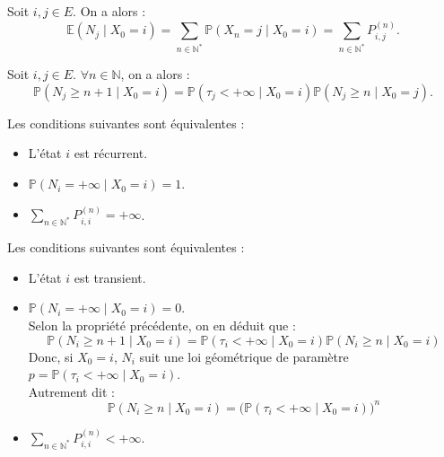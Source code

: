 \documentclass{article}
\begin{document}
\begin{tcolorbox}[colback=white,colframe=yellow!80!black,title=Exemple (Application de $N_i$ à l'espérance)]
Soit $i, j \in E$. On a alors :
\[
\mathbb{E}(N_j \mid X_0 = i) = \sum_{n \in \mathbb{N}^{*}} \mathbb{P}(X_n = j \mid X_0 = i) = \sum_{n \in \mathbb{N}^{*}} P_{i,j}^{(n)}.
\]
\end{tcolorbox}

\begin{tcolorbox}[colback=white,colframe=red!80!black,title=Formule de récurrence conditionnelle (admise)]
Soit $i, j \in E$. $\forall n \in \mathbb{N}$, on a alors :
\[
\mathbb{P}(N_j \geq n+1 \mid X_0 = i) = \mathbb{P}(\tau_j < +\infty \mid X_0 = i)\mathbb{P}(N_j \geq n \mid X_0 = j).
\]
\end{tcolorbox}

\begin{tcolorbox}[colback=white,colframe=blue!80!black,title=Propriétés équivalentes des états récurrents/transients]
Les conditions suivantes sont équivalentes :
\begin{itemize}
    \item L'état $i$ est récurrent.
    \item $\mathbb{P}(N_i = +\infty \mid X_0 = i) = 1$.
    \item $\sum_{n \in \mathbb{N}^{*}} P_{i,i}^{(n)} = +\infty$. \\
\end{itemize}

Les conditions suivantes sont équivalentes :
\begin{itemize}
    \item L'état $i$ est transient.
    \item $\mathbb{P}(N_i = +\infty \mid X_0 = i) = 0$.
    \vspace{1em} \\
        Selon la propriété précédente, on en déduit que :
        \[
        \mathbb{P}(N_i \geq n+1 \mid X_0 = i) = \mathbb{P}(\tau_i < +\infty \mid X_0 = i)\mathbb{P}(N_i \geq n \mid X_0 = i)
        \]
        Donc, si $X_0 = i$, $N_i$ suit une loi géométrique de paramètre $p = \mathbb{P}(\tau_i < +\infty \mid X_0 = i)$. \\
        Autrement dit :
        \[
        \mathbb{P}(N_i \geq n \mid X_0 = i) = \big(\mathbb{P}(\tau_i < +\infty \mid X_0 = i)\big)^{n}
        \]
    \item $\sum_{n \in \mathbb{N}^{*}} P_{i,i}^{(n)} < +\infty$.
\end{itemize}
\end{tcolorbox}
\end{document}
